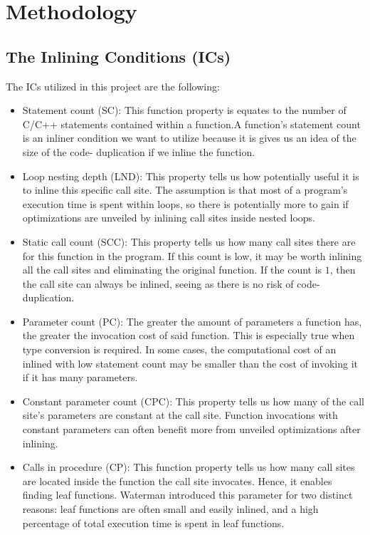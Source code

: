 
\clearpage
\section{Methodology}
\label{sec:methodology}


\subsection{The Inlining Conditions (ICs)}
\label{sub:meth:inlining_conditions}


The ICs utilized in this project are the following:

\begin{itemize}

	\item Statement count (SC): This function property is equates to the number
of C/C++ statements contained within a function.A function's statement count is
an inliner condition we want to utilize because it is gives us an idea of the
size of the code- duplication if we inline the function.

	\item Loop nesting depth (LND): This property tells us how potentially
useful it is to inline this specific call site. The assumption is that most of a
program's execution time is spent within loops, so there is potentially more to
gain if optimizations are unveiled by inlining call sites inside nested loops.

	\item Static call count (SCC): This property tells us how many call sites
there are for this function in the program. If this count is low, it may be
worth inlining all the call sites and eliminating the original function. If the
count is $1$, then the call site can always be inlined, seeing as there is no
risk of code-duplication.

	\item Parameter count (PC): The greater the amount of parameters a function
has, the greater the invocation cost of said function. This is especially true
when type conversion is required. In some cases, the computational cost of an
inlined with low statement count may be smaller than the cost of invoking it if
it has many parameters\cite{AdaptvCompilAndInlingWaterman}.

	\item Constant parameter count (CPC): This property tells us how many of the
call site's parameters are constant at the call site. Function invocations with
constant parameters can often benefit more from unveiled optimizations after
inlining.

	\item Calls in procedure (CP): This function property tells us how many call
sites are located inside the function the call site invocates. Hence, it enables
finding leaf functions. Waterman\cite{AdaptvCompilAndInlingWaterman} introduced
this parameter for two distinct reasons: leaf functions are often small and
easily inlined, and a high percentage of total execution time is spent in leaf
functions.

\end{itemize}
